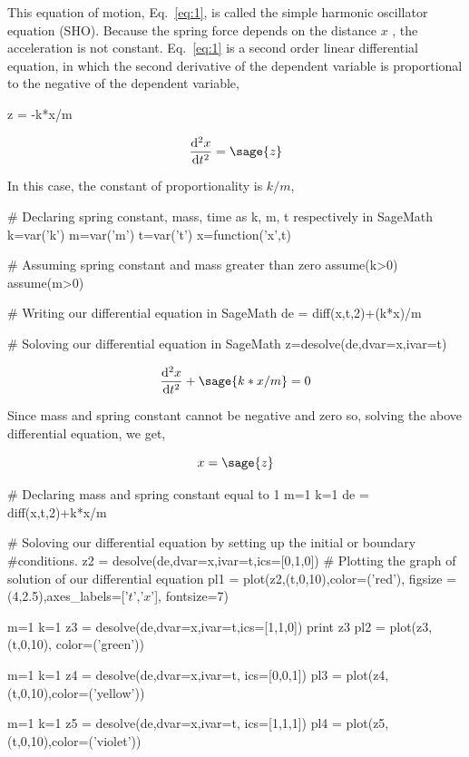This equation of motion, Eq.~\ref{eq:1}, is called the simple harmonic 
oscillator equation (SHO). Because the spring force depends on the distance 
$x$ , the acceleration is not constant. Eq.~\ref{eq:1} is a second order linear 
differential equation, in which the second derivative of the dependent variable 
is proportional to the negative of the dependent variable,

\begin{sagesilent}
z = -k*x/m
\end{sagesilent}

\begin{equation}
\frac{\mathrm{d}^{2}x}{\mathrm{d}t^{2}} = \sage{z}
\end{equation}

In this case, the constant of proportionality is $k/m$,

\begin{sagesilent}
# Declaring spring constant, mass, time as k, m, t respectively in SageMath
k=var('k')
m=var('m')
t=var('t')
x=function('x',t)

# Assuming spring constant and mass greater than zero
assume(k>0)
assume(m>0)

# Writing our differential equation in SageMath
de = diff(x,t,2)+(k*x)/m

# Soloving our differential equation in SageMath
z=desolve(de,dvar=x,ivar=t)
\end{sagesilent}

\begin{equation}
  \frac{\mathrm{d}^{2}x}{\mathrm{d}t^{2}} +  \sage{k*x/m} = 0
\end{equation}

Since mass and spring constant cannot be negative and zero so, solving the 
above differential equation, we get,

\begin{equation}
x = \sage{z}
\label{eq:2}
\end{equation}

\begin{sagesilent}
# Declaring mass and spring constant equal to 1
m=1
k=1
de = diff(x,t,2)+k*x/m

# Soloving our differential equation by setting up the initial or boundary 
#conditions.
z2 = desolve(de,dvar=x,ivar=t,ics=[0,1,0])
# Plotting the graph of solution of our differential equation
pl1 = plot(z2,(t,0,10),color=('red'), figsize = 
(4,2.5),axes_labels=['$t$','$x$'], fontsize=7)

m=1
k=1
z3 = desolve(de,dvar=x,ivar=t,ics=[1,1,0])
print z3
pl2 = plot(z3,(t,0,10), color=('green'))

m=1
k=1
z4 = desolve(de,dvar=x,ivar=t, ics=[0,0,1])
pl3 = plot(z4,(t,0,10),color=('yellow'))

m=1
k=1
z5 = desolve(de,dvar=x,ivar=t, ics=[1,1,1])
pl4 = plot(z5,(t,0,10),color=('violet'))
\end{sagesilent}

